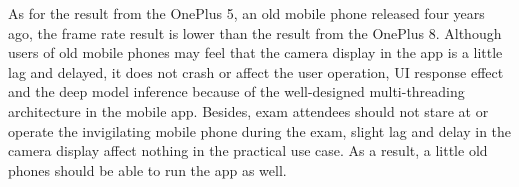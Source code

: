 As for the result from the OnePlus 5, an old mobile phone released four years ago, the frame rate result is lower than the result from the OnePlus 8.
Although users of old mobile phones may feel that the camera display in the app is a little lag and delayed, it does not crash or affect the user operation, UI response effect and the deep model inference because of the well-designed multi-threading architecture in the mobile app.
Besides, exam attendees should not stare at or operate the invigilating mobile phone during the exam, slight lag and delay in the camera display affect nothing in the practical use case.
As a result, a little old phones should be able to run the app as well.
